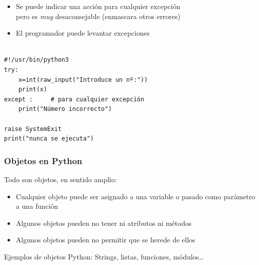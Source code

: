 \documentclass{beamer}
\begin{document}
\begin{frame}[fragile]

\begin{itemize}
\item Se puede indicar una acción para cualquier excepción\\
      pero es \emph{muy} desaconsejable (enmascara otros errores)
\item  El programador puede levantar excepciones
\end{itemize}

  \begin{footnotesize}
\begin{verbatim}

#!/usr/bin/python3
try:
    x=int(raw_input("Introduce un nº:"))
    print(x)
except :     # para cualquier excepción
    print("Número incorrecto")

raise SystemExit
print("nunca se ejecuta")
\end{verbatim}
  \end{footnotesize}


\end{frame}









\begin{frame}
\frametitle{Objetos en Python}

Todo son objetos, en sentido amplio:
\begin{itemize}
\item Cualquier objeto puede ser asignado a una variable o pasado como
  parámetro a una función
\item Algunos objetos pueden no tener ni atributos ni métodos
\item Algunos objetos pueden no permitir que se herede de ellos
\end{itemize}

Ejemplos de objetos Python: Strings, listas, funciones, módulos\ldots
\end{frame}
\end{document}
